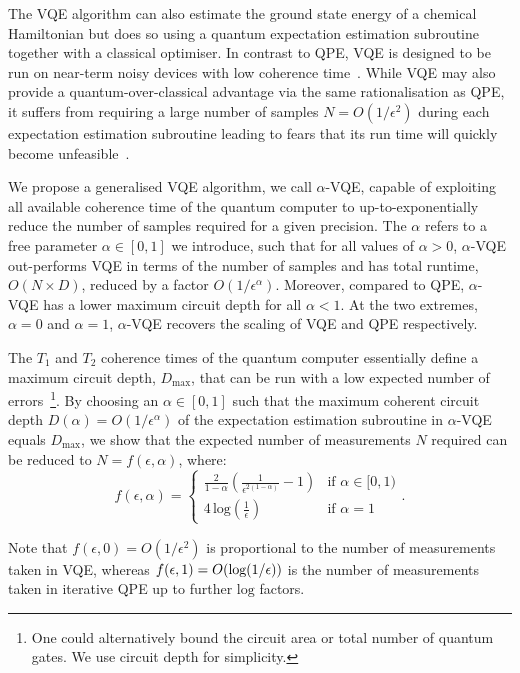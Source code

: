 \documentclass[twocolumn,
 reprint,
 amsmath,amssymb,
 aps,
 floatfix,
superscriptaddress
]{revtex4-1}
\begin{document}
The VQE algorithm can also estimate the ground state energy of a chemical Hamiltonian
but does so using a quantum expectation estimation subroutine together
with a classical optimiser. In contrast to QPE, VQE is designed to be run on near-term noisy devices with low coherence time~\cite{Peruzzo2014,McClean2016,OMalley2016}. While VQE may also provide a quantum-over-classical advantage via the same rationalisation as QPE, it suffers from requiring a large number of samples $N=O(1/\epsilon^{2})$ during each expectation estimation subroutine leading to fears that
its run time will quickly become unfeasible~\cite{Wecker2015}. 

We propose a generalised VQE algorithm, we call $\alpha$-VQE, capable of exploiting all available coherence time of the quantum computer to up-to-exponentially reduce the number of samples required for a given precision.  The $\alpha$ refers to a free parameter $\alpha\in[0,1]$ we introduce, such that for all values of $\alpha >0$, $\alpha$-VQE out-performs VQE in terms of the number of samples and has total runtime, $O(N \times D)$, reduced by a factor $O(1/\epsilon^\alpha)$. Moreover, compared to QPE, $\alpha$-VQE has a lower maximum circuit depth for all  $\alpha <1$. At the two extremes, $\alpha =0$ and $\alpha =1$, $\alpha$-VQE recovers the scaling of VQE and QPE respectively.

The $T_{1}$ and $T_{2}$ coherence times of the quantum computer essentially define a maximum circuit depth, $D_{\text{max}}$, that can be run with a low expected number of errors~\footnote{One could alternatively bound the circuit area or total number of quantum gates. We use circuit depth for simplicity.}. By choosing an $\alpha\in[0,1]$ such that
the maximum coherent circuit depth $D(\alpha)=O(1/\epsilon^{\alpha})$ of the expectation
estimation subroutine in $\alpha$-VQE equals
$D_{\text{max}}$,
we show that the expected number of measurements $N$
required can be reduced to $N=f(\epsilon, \alpha)$, where:
\begin{equation}\label{eq:f_epsilon_alpha}
f(\epsilon,\alpha)=\begin{cases}
\frac{2}{1-\alpha}(\frac{1}{\epsilon^{2(1-\alpha)}}-1) & \text{if }\alpha\in[0,1)\\[5pt]
4\,\text{log}(\frac{1}{\epsilon}) & \text{if }\alpha=1
\end{cases}.
\end{equation}

Note that $f(\epsilon,0)=O(1/\epsilon^{2})$ is proportional to the number
of measurements taken in VQE, whereas $f(\epsilon,1)=O(\text{log(1/\ensuremath{\epsilon})})$
is the number of measurements taken in iterative QPE up to further $\text{log}$
factors. 
\end{document}
